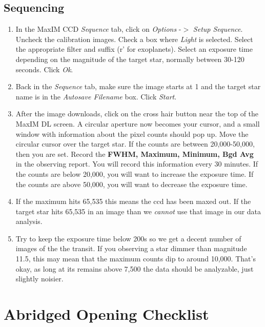 \documentclass[11pt]{report}
\begin{document}
\section{Sequencing}

\begin{enumerate}
\item In the MaxIM CCD \emph{Sequence} tab, click on \emph{Options} -{$>$} \emph{Setup Sequence}. Uncheck the calibration images. Check a box where \emph{Light} is selected. Select the appropriate filter and suffix (r' for exoplanets). Select an exposure time depending on the magnitude of the target star, normally between 30-120 seconds. Click \emph{Ok}.
\item Back in the \emph{Sequence} tab, make sure the image starts at 1 and the target star name is in the \emph{Autosave Filename} box. Click \emph{Start}.
\item After the image downloads, click on the cross hair button near the top of the MaxIM DL screen. A circular aperture now becomes your cursor, and a small window with information about the pixel counts should pop up. Move the circular cursor over the target star. If the counts are between 20,000-50,000, then you are set. Record the {\bf FWHM, Maximum, Minimum, Bgd Avg} in the observing report. You will record this information every 30 minutes. If the counts are below 20,000, you will want to increase the exposure time. If the counts are above 50,000, you will want to decrease the exposure time. 
\item If the maximum hits 65,535 this means the ccd has been maxed out. If the target star hits 65,535 in an image than we \emph{cannot} use that image in our data analysis. 
\item Try to keep the exposure time below 200s so we get a decent number of images of the the transit. If you observing a star dimmer than magnitude 11.5, this may mean that the maximum counts dip to around 10,000. That's okay, as long at its remains above 7,500 the data should be analyzable, just slightly noisier. 
\end{enumerate}

\chapter{Abridged Opening Checklist}
\end{document}
